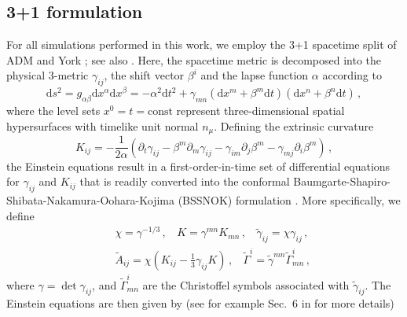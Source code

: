 \documentclass[]{iopart}
\newcommand{\du}{\mathrm{d}}
\begin{document}
\subsection{3+1 formulation}
%
For all simulations performed in this work, we employ the 3+1
spacetime split of ADM \cite{Arnowitt:1962hi} and York \cite{York1979};
see also \cite{Gourgoulhon:2007ue}. Here, the spacetime metric is
decomposed into the physical 3-metric $\gamma_{ij}$, the shift
vector $\beta^i$ and the lapse function $\alpha$ according to
%
\begin{equation}
  \du s^2 = g_{\alpha\beta}\du x^{\alpha}\du x^{\beta}
  = -\alpha^2 \du t^2 + \gamma_{mn}(\du x^m+\beta^m \du t)
  (\du x^n + \beta^n \du t)\,,
\end{equation}
%
where the level sets $x^0=t=\mathrm{const}$ represent three-dimensional
spatial hypersurfaces with timelike unit normal $n_{\mu}$.  Defining
the extrinsic curvature
%
\begin{equation}
  K_{ij} = -\frac{1}{2\alpha}(\partial_t \gamma_{ij}
  -\beta^m\partial_m \gamma_{ij} -\gamma_{im}\partial_j
  \beta^m-\gamma_{mj}\partial_i \beta^m)\,,
  \label{eq:Kij}
\end{equation}
%
the Einstein equations result in a first-order-in-time set of
differential equations for $\gamma_{ij}$ and $K_{ij}$ that is readily
converted into the conformal
Baumgarte-Shapiro-Shibata-Nakamura-Oohara-Kojima (BSSNOK) formulation
\cite{Baumgarte:1998te,Shibata:1995we,Nakamura:1987zz}.  More
specifically, we define
%
\begin{eqnarray}
  &&\chi = \gamma^{-1/3}\,,~~~~
  K=\gamma^{mn}K_{mn}\,,~~~~
  \tilde{\gamma}_{ij}=\chi \gamma_{ij}\,, \nonumber \\
  &&
  \tilde{A}_{ij}=\chi\left(K_{ij}-\frac{1}{3}\gamma_{ij}K\right)\,,~~~~
  \tilde{\Gamma}^i=\tilde{\gamma}^{mn}\tilde{\Gamma}^i_{mn}\,,
\end{eqnarray}
%
where $\gamma=\det \gamma_{ij}$, and $\tilde{\Gamma}^i_{mn}$ are
the Christoffel symbols associated with $\tilde{\gamma}_{ij}$.  The
Einstein equations are then given by (see for example Sec.~6 in
\cite{Cardoso:2014uka} for more details)
%
\end{document}

